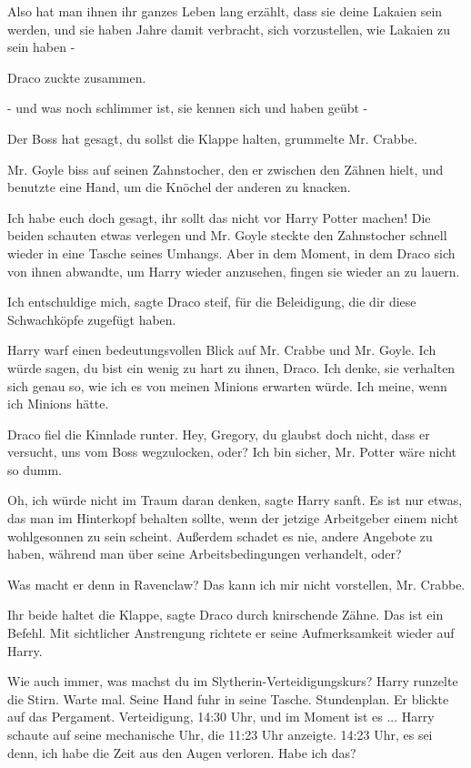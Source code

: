 \glqq{}Also hat man ihnen ihr ganzes Leben lang erzählt, dass sie deine Lakaien
sein werden, und sie haben Jahre damit verbracht, sich vorzustellen, wie Lakaien
zu sein haben -\grqq{}

Draco zuckte zusammen.

\glqq{}- und was noch schlimmer ist, sie kennen sich und haben geübt -\grqq{}

\glqq{}Der Boss hat gesagt, du sollst die Klappe halten\grqq{}, grummelte Mr.
Crabbe.

Mr. Goyle biss auf seinen Zahnstocher, den er zwischen den Zähnen hielt, und
benutzte eine Hand, um die Knöchel der anderen zu knacken.

\glqq{}Ich habe euch doch gesagt, ihr sollt das nicht vor Harry Potter
machen!\grqq{} Die beiden schauten etwas verlegen und Mr. Goyle steckte den
Zahnstocher schnell wieder in eine Tasche seines Umhangs. Aber in dem Moment, in
dem Draco sich von ihnen abwandte, um Harry wieder anzusehen, fingen sie wieder
an zu lauern.

\glqq{}Ich entschuldige mich\grqq{}, sagte Draco steif, \glqq{}für die
Beleidigung, die dir diese Schwachköpfe zugefügt haben.\grqq{}

Harry warf einen bedeutungsvollen Blick auf Mr. Crabbe und Mr. Goyle. \glqq{}Ich
würde sagen, du bist ein wenig zu hart zu ihnen, Draco. Ich denke, sie verhalten
sich genau so, wie ich es von meinen Minions erwarten würde. Ich meine, wenn ich
Minions hätte.\grqq{}

Draco fiel die Kinnlade runter. \glqq{}Hey, Gregory, du glaubst doch nicht, dass
er versucht, uns vom Boss wegzulocken, oder?\grqq{} \glqq{}Ich bin sicher, Mr.
Potter wäre nicht so dumm.\grqq{}

\glqq{}Oh, ich würde nicht im Traum daran denken\grqq{}, sagte Harry sanft. \glqq
Es ist nur etwas, das man im Hinterkopf behalten sollte, wenn der jetzige
Arbeitgeber einem nicht wohlgesonnen zu sein scheint. Außerdem schadet es nie,
andere Angebote zu haben, während man über seine Arbeitsbedingungen verhandelt,
oder?\grqq{}

\glqq{}Was macht er denn in Ravenclaw?\grqq{} \glqq{}Das kann ich mir nicht
vorstellen, Mr. Crabbe.\grqq{}

\glqq{}Ihr beide haltet die Klappe\grqq{}, sagte Draco durch knirschende Zähne.
\glqq{}Das ist ein Befehl.\grqq{} Mit sichtlicher Anstrengung richtete er seine
Aufmerksamkeit wieder auf Harry.

\glqq{}Wie auch immer, was machst du im Slytherin-Verteidigungskurs?\grqq{} Harry
runzelte die Stirn. \glqq{}Warte mal.\grqq{} Seine Hand fuhr in seine Tasche.
\glqq{}Stundenplan.\grqq{} Er blickte auf das Pergament. \glqq{}Verteidigung,
14:30 Uhr, und im Moment ist es ...\grqq{} Harry schaute auf seine mechanische
Uhr, die 11:23 Uhr anzeigte. \glqq{}14:23 Uhr, es sei denn, ich habe die Zeit aus
den Augen verloren. Habe ich das?\grqq{}

